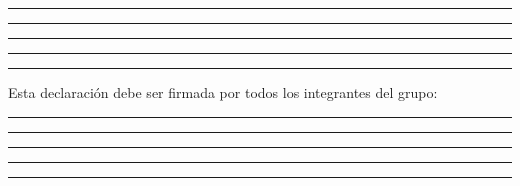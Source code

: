 \noindent \rule{\textwidth}{0.4pt}

\vspace{0.5cm}

\noindent \rule{\textwidth}{0.4pt}

\vspace{0.5cm}

\noindent \rule{\textwidth}{0.4pt}

\vspace{0.5cm}

\noindent \rule{\textwidth}{0.4pt}

\vspace{0.5cm}

\noindent \rule{\textwidth}{0.4pt}

\vspace{1cm}

\noindent Esta declaración debe ser firmada por todos los integrantes del grupo:

\vspace{1cm}

\noindent \rule{\textwidth}{0.4pt}

\vspace{0.8cm}

\noindent \rule{\textwidth}{0.4pt}

\vspace{0.8cm}

\noindent \rule{\textwidth}{0.4pt}

\vspace{0.8cm}

\noindent \rule{\textwidth}{0.4pt}

\vspace{0.8cm}

\noindent \rule{\textwidth}{0.4pt}